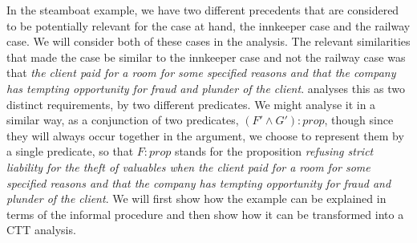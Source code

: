 			In the steamboat example, we have two different precedents that are considered to be potentially relevant for the case at hand, the innkeeper case and the railway case. We will consider both of these cases in the analysis. The relevant similarities that made the case be similar to the innkeeper case and not the railway case was that \textit{the client paid for a room for some specified reasons and that the company has tempting opportunity for fraud and plunder of the client}. \textcite[p. 1005]{Brewer1996} analyses this as two distinct requirements, by two different predicates. We might analyse it in a similar way, as a conjunction of two predicates, $(F' \land G') : prop$, though since they will always occur together in the argument, we choose to represent them by a single predicate, so that $F : prop$ stands for the proposition \textit{refusing strict liability for the theft of valuables when the client paid for a room for some specified reasons and that the company has tempting opportunity for fraud and plunder of the client}. We will first show how the example can be explained in terms of the informal procedure and then show how it can be transformed into a CTT analysis. 
			
